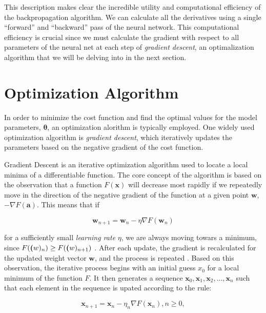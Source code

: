 \documentclass[a4paper, UKenglish, 11pt]{uiomaster}
\begin{document}
This description makes clear the incredible utility and computational efficiency of the backpropagation algorithm. We can calculate all the derivatives using a single “forward” and “backward” pass of the neural network. This computational efficiency is crucial since we must calculate the gradient with respect to all parameters of the neural net at each step of \emph{gradient descent}, an optimalization algorithm that we will be delving into in the next section.


\section{Optimization Algorithm}
In order to minimize the cost function and find the optimal values for the model parameters, $\boldsymbol{\theta}$, an optimization alorithm is typically employed. One widely used optimization algorithm is \emph{gradient descent}, which iteratively updates the parameters based on the negative gradient of the cost function.

Gradient Descent is an iterative optimization algorithm used to locate a local minima of a differentiable function. The core concept of the algorithm is based on the observation that a function $F(\textbf{x})$ will decrease most rapidly if we repeatedly move in the direction of the negative gradient of the function at a given point $\textbf{w}$, $-\nabla F(\textbf{a})$. This means that if

\begin{equation}
\textbf{w}_{n+1} = \textbf{w}_n - \eta\nabla F(\textbf{w}_n)
\end{equation}

for a sufficiently small \emph{learning rate} $\eta$, we are always moving towars a minimum, since $F(\textbf(w)_n) \ge F(\textbf(w)_{n+1})$ \cite{wiki-gradient-descent}. After each update, the gradient is recalculated for the updated weight vector $\textbf{w}$, and the process is repeated \cite{bishop2006pattern}. Based on this observation, the iterative process begins with an initial guess $x_0$ for a local minimum of the function $F$. It then generates a sequence $\textbf{x}_0, \textbf{x}_1, \textbf{x}_2, ..., \textbf{x}_n$ such that each element in the sequence is upated according to the rule:

\begin{equation}
\textbf{x}_{n+1} = \textbf{x}_{n} - \eta_n\nabla F(\textbf{x}_n), n \ge 0,
\end{equation}
\end{document}

